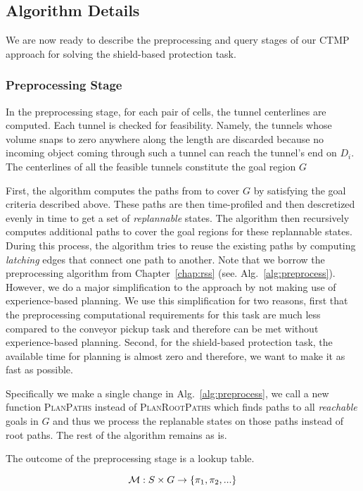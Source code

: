 \documentclass[a4paper]{report}
\begin{document}
\subsection{Algorithm Details}
We are now ready to describe the preprocessing and query stages of our CTMP approach for solving the shield-based protection task.

\subsubsection{Preprocessing Stage}
In the preprocessing stage, for each pair of cells, the tunnel centerlines are computed. Each tunnel is checked for feasibility. Namely, the tunnels whose volume snaps to zero anywhere along the length are discarded because no incoming object coming through such a tunnel can reach the tunnel's end on $D_i$. The centerlines of all the feasible tunnels constitute the goal region $G$

First, the algorithm computes the paths from \Shome to cover $G$ by satisfying the goal criteria described above. These paths are then time-profiled and then descretized evenly in time to get a set of \emph{replannable} states. The algorithm then recursively computes additional paths to cover the goal regions for these replannable states. During this process, the algorithm tries to reuse the existing paths by computing \emph{latching} edges that connect one path to another. Note that we borrow the preprocessing algorithm from Chapter~\ref{chap:rss} (see. Alg.~\ref{alg:preprocess}). However, we do a major simplification to the approach by not making use of experience-based planning. We use this simplification for two reasons, first that the preprocessing computational requirements for this task are much less compared to the conveyor pickup task and therefore can be met without experience-based planning. Second, for the shield-based protection task, the available time for planning is almost zero and therefore, we want to make it as fast as possible.

Specifically we make a single change in Alg.~\ref{alg:preprocess}, we call a new function \textsc{PlanPaths} instead of \textsc{PlanRootPaths} which finds paths to all \emph{reachable} goals in $G$ and thus we process the replanable states on those paths instead of root paths. The rest of the algorithm remains as is.

The outcome of the preprocessing stage is a lookup table.

$$
\mathcal{M} : S \times G \rightarrow \{\pi_1, \pi_2, ...\}
$$
\end{document}
